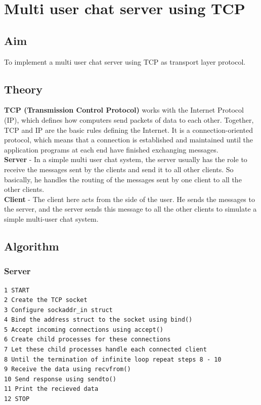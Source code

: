 \section{Multi user chat server using TCP}
\subsection{Aim}
To implement a multi user chat server using TCP as transport layer protocol.

\subsection{Theory}
\textbf{TCP (Transmission Control Protocol)} works with the Internet Protocol (IP),
which defines how computers send packets of data to each other. Together, TCP
and IP are the basic rules defining the Internet. It is a connection-oriented protocol,
which means that a connection is established and maintained until the application
programs at each end have finished exchanging messages.\\
\textbf{Server} - In a simple multi user chat system, the server usually has the role to
receive the messages sent by the clients and send it to all other clients. So basically,
he handles the routing of the messages sent by one client to all the other clients.\\
\textbf{Client} - The client here acts from the side of the user. He sends the messages
to the server, and the server sends this message to all the other clients to simulate
a simple multi-user chat system.

\subsection{Algorithm}
\subsubsection{Server}
\begin{verbatim}
1 START
2 Create the TCP socket
3 Configure sockaddr_in struct
4 Bind the address struct to the socket using bind()
5 Accept incoming connections using accept()
6 Create child processes for these connections
7 Let these child processes handle each connected client
8 Until the termination of infinite loop repeat steps 8 - 10
9 Receive the data using recvfrom()
10 Send response using sendto()
11 Print the recieved data
12 STOP
\end{verbatim}

